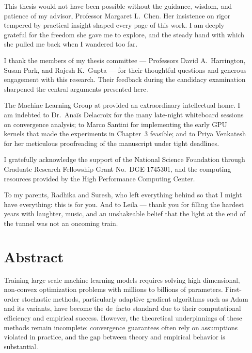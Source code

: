 \documentclass[11pt,twoside,openright]{book}
\begin{document}
This thesis would not have been possible without the guidance, wisdom, and patience of my advisor,
Professor Margaret L.\ Chen. Her insistence on rigor tempered by practical insight shaped every
page of this work. I am deeply grateful for the freedom she gave me to explore, and the steady hand
with which she pulled me back when I wandered too far.

I thank the members of my thesis committee — Professors David A.\ Harrington, Susan Park, and
Rajesh K.\ Gupta — for their thoughtful questions and generous engagement with this research.
Their feedback during the candidacy examination sharpened the central arguments presented here.

The Machine Learning Group at  provided an extraordinary intellectual home. I am indebted to
Dr.\ Ana\"{i}s Delacroix for the many late-night whiteboard sessions on convergence analysis;
to Marco Santini for implementing the early GPU kernels that made the experiments in Chapter~3
feasible; and to Priya Venkatesh for her meticulous proofreading of the manuscript under tight
deadlines.

I gratefully acknowledge the support of the National Science Foundation through Graduate Research
Fellowship Grant No.\ DGE-1745301, and the computing resources provided by the  High
Performance Computing Center.

To my parents, Radhika and Suresh, who left everything behind so that I might have everything:
this is for you. And to Leila — thank you for filling the hardest years with laughter, music, and
an unshakeable belief that the light at the end of the tunnel was not an oncoming train.

\cleardoublepage
\chapter*{Abstract}

Training large-scale machine learning models requires solving high-dimensional, non-convex
optimization problems with millions to billions of parameters. First-order stochastic methods,
particularly adaptive gradient algorithms such as Adam and its variants, have become the de~facto
standard due to their computational efficiency and empirical success. However, the theoretical
underpinnings of these methods remain incomplete: convergence guarantees often rely on
assumptions violated in practice, and the gap between theory and empirical behavior is
substantial.
\end{document}
